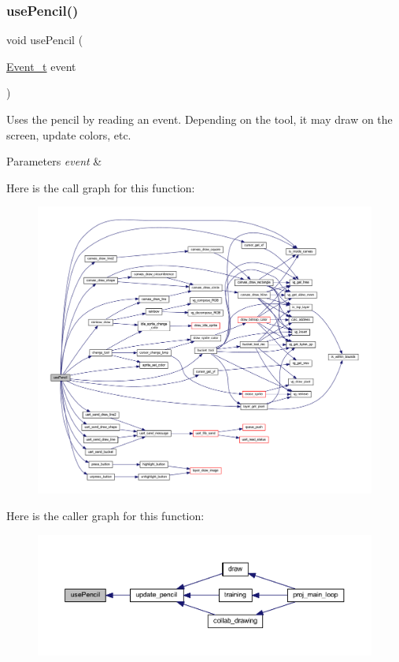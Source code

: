 \subsubsection{\texorpdfstring{use\+Pencil()}{usePencil()}}
{\footnotesize\ttfamily void use\+Pencil (\begin{DoxyParamCaption}\item[{\mbox{\hyperlink{struct_event__t}{Event\+\_\+t}}}]{event }\end{DoxyParamCaption})}



Uses the pencil by reading an event. Depending on the tool, it may draw on the screen, update colors, etc. 


\begin{DoxyParams}{Parameters}
{\em event} & \\
\hline
\end{DoxyParams}
Here is the call graph for this function\+:\nopagebreak
\begin{figure}[H]
\begin{center}
\leavevmode
\includegraphics[width=350pt]{group__pengoo_ga6ac5130bfa3fa90697b1368d605563c0_cgraph}
\end{center}
\end{figure}
Here is the caller graph for this function\+:\nopagebreak
\begin{figure}[H]
\begin{center}
\leavevmode
\includegraphics[width=350pt]{group__pengoo_ga6ac5130bfa3fa90697b1368d605563c0_icgraph}
\end{center}
\end{figure}
\mbox{\label{group__pengoo_ga92c88d0b081234c242ddccf22be99782}} 
